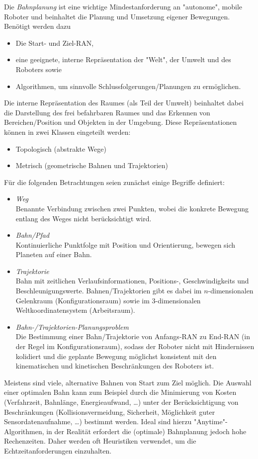 	Die \emph{Bahnplanung} ist eine wichtige Mindestanforderung an "autonome", mobile Roboter und beinhaltet die Planung und Umsetzung eigener Bewegungen. Benötigt werden dazu
	\begin{itemize}
		\item Die Start- und Ziel-RAN,
		\item eine geeignete, interne Repräsentation der "Welt", \dh der Umwelt und des Roboters sowie
		\item Algorithmen, um sinnvolle Schlussfolgerungen/Planungen zu ermöglichen.
	\end{itemize}
	Die interne Repräsentation des Raumes (als Teil der Umwelt) beinhaltet dabei die Darstellung des frei befahrbaren Raumes und das Erkennen von Bereichen/Position und Objekten in der Umgebung. Diese Repräsentationen können in zwei Klassen eingeteilt werden:
	\begin{itemize}
		\item Topologisch (abstrakte Wege)
		\item Metrisch (geometrische Bahnen und Trajektorien)
	\end{itemize}
	Für die folgenden Betrachtungen seien zunächst einige Begriffe definiert:
	\begin{itemize}
		\item \emph{Weg} \\ Benannte Verbindung zwischen zwei Punkten, wobei die konkrete Bewegung entlang des Weges nicht berücksichtigt wird.
		\item \emph{Bahn/Pfad} \\ Kontinuierliche Punktfolge mit Position und Orientierung, \bspw bewegen sich Planeten auf einer Bahn.
		\item \emph{Trajektorie} \\ Bahn mit zeitlichen Verlaufsinformationen, \dh Positions-, Geschwindigkeits und \ggf Beschleunigungswerte. Bahnen/Trajektorien gibt es dabei im \(n\)-dimensionalen Gelenkraum (Konfigurationsraum) sowie im \num{3}-dimensionalen Weltkoordinatensystem (Arbeitsraum).
		\item \emph{Bahn-/Trajektorien-Planungsproblem} \\ Die Bestimmung einer Bahn/Trajektorie von Anfangs-RAN zu End-RAN (in der Regel im Konfigurationsraum), sodass der Roboter nicht mit Hindernissen kolidiert und die geplante Bewegung möglichst konsistent mit den kinematischen und kinetischen Beschränkungen des Roboters ist.
	\end{itemize}
	Meistens sind viele, alternative Bahnen von Start zum Ziel möglich. Die Auswahl einer optimalen Bahn kann zum Beispiel durch die Minimierung von Kosten (\zB Verfahrzeit, Bahnlänge, Energieaufwand, \dots) unter der Berücksichtigung von Beschränkungen (Kollisionsvermeidung, Sicherheit, Möglichkeit guter Sensordatenaufnahme, \dots) bestimmt werden. Ideal sind hierzu "Anytime"-Algorithmen, in der Realität erfordert die (optimale) Bahnplanung jedoch hohe Rechenzeiten. Daher werden oft Heuristiken verwendet, um die Echtzeitanforderungen einzuhalten.
	
